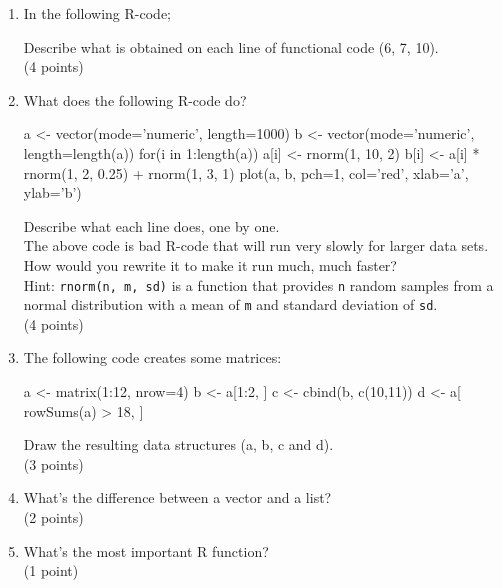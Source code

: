 \documentclass[11pt]{article}
\begin{document}
\begin{enumerate}
\item In the following R-code;

  Describe what is obtained on each line of functional code (6, 7, 10).\\
  (4 points)
\item What does the following R-code do?

  \begin{rcode}
  a <- vector(mode='numeric', length=1000)
  b <- vector(mode='numeric', length=length(a))
  for(i in 1:length(a)){
    a[i] <- rnorm(1, 10, 2)
    b[i] <- a[i] * rnorm(1, 2, 0.25) + rnorm(1, 3, 1)
  }
  plot(a, b, pch=1, col='red', xlab='a', ylab='b')    
  \end{rcode}
  Describe what each line does, one by one.\\
  The above code is bad R-code that will run very slowly for larger data
  sets. How would you rewrite it to make it run much, much faster?\\
  Hint: \texttt{rnorm(n, m, sd)} is a function that provides 
  \texttt{n} random samples from a normal distribution with a mean
  of \texttt{m} and standard deviation of \texttt{sd}.\\
  (4 points)
\item The following code creates some matrices:
 
  \begin{rcode}
  a <- matrix(1:12, nrow=4)
  b <- a[1:2, ]
  c <- cbind(b, c(10,11))
  d <- a[ rowSums(a) > 18, ]
  \end{rcode}
  Draw the resulting data structures (a, b, c and d).\\
  (3 points)
\item What's the difference between a vector and a list?\\
  (2 points)
\item What's the most important R function?\\
  (1 point)
\end{enumerate}
\end{document}

